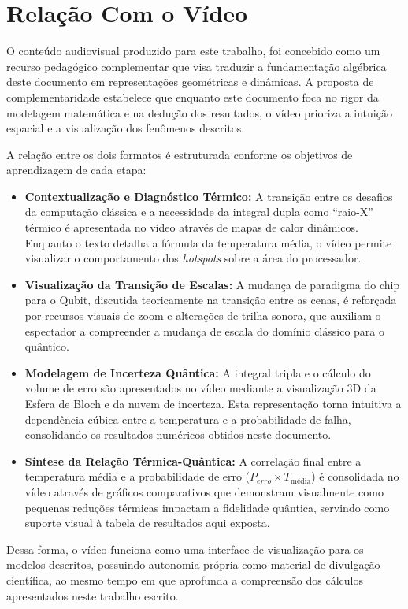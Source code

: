 \section{Relação Com o Vídeo}

O conteúdo audiovisual produzido para este trabalho, foi concebido como um recurso pedagógico complementar que visa traduzir a fundamentação algébrica deste documento em representações geométricas e dinâmicas. A proposta de complementaridade estabelece que enquanto este documento foca no rigor da modelagem matemática e na dedução dos resultados, o vídeo prioriza a intuição espacial e a visualização dos fenômenos descritos.

A relação entre os dois formatos é estruturada conforme os objetivos de aprendizagem de cada etapa:

\begin{itemize}
    \item \textbf{Contextualização e Diagnóstico Térmico:} A transição entre os desafios da computação clássica e a necessidade da integral dupla como ``raio-X'' térmico é apresentada no vídeo através de mapas de calor dinâmicos. Enquanto o texto detalha a fórmula da temperatura média, o vídeo permite visualizar o comportamento dos \textit{hotspots} sobre a área do processador.
    
    \item \textbf{Visualização da Transição de Escalas:} A mudança de paradigma do chip para o Qubit, discutida teoricamente na transição entre as cenas, é reforçada por recursos visuais de zoom e alterações de trilha sonora, que auxiliam o espectador a compreender a mudança de escala do domínio clássico para o quântico.
    
    \item \textbf{Modelagem de Incerteza Quântica:} A integral tripla e o cálculo do volume de erro são apresentados no vídeo mediante a visualização 3D da Esfera de Bloch e da nuvem de incerteza. Esta representação torna intuitiva a dependência cúbica entre a temperatura e a probabilidade de falha, consolidando os resultados numéricos obtidos neste documento.
    
    \item \textbf{Síntese da Relação Térmica-Quântica:} A correlação final entre a temperatura média e a probabilidade de erro ($P_{erro} \times T_{\text{média}}$) é consolidada no vídeo através de gráficos comparativos que demonstram visualmente como pequenas reduções térmicas impactam a fidelidade quântica, servindo como suporte visual à tabela de resultados aqui exposta.
\end{itemize}

Dessa forma, o vídeo funciona como uma interface de visualização para os modelos descritos, possuindo autonomia própria como material de divulgação científica, ao mesmo tempo em que aprofunda a compreensão dos cálculos apresentados neste trabalho escrito.